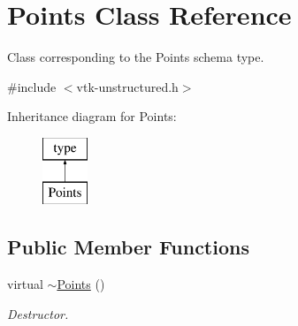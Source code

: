 \hypertarget{classPoints}{\section{Points Class Reference}
\label{classPoints}
}


Class corresponding to the Points schema type.  




{\ttfamily \#include $<$vtk-\/unstructured.\+h$>$}

Inheritance diagram for Points\+:\begin{figure}[H]
\begin{center}
\leavevmode
\includegraphics[height=2.000000cm]{classPoints}
\end{center}
\end{figure}
\subsection*{Public Member Functions}
\begin{DoxyCompactItemize}
\item 
virtual \hyperlink{classPoints_a9d56d7dc8b6a6f492e07d354eb379c12}{$\sim$\+Points} ()
\begin{DoxyCompactList}\small\item\em Destructor. \end{DoxyCompactList}\end{DoxyCompactItemize}

